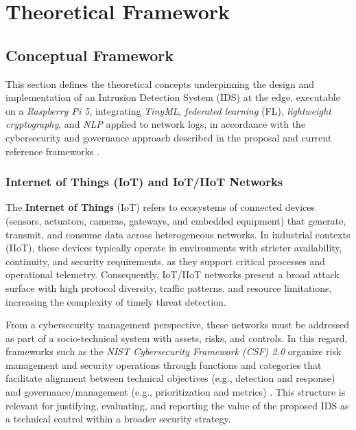 \chapter{Theoretical Framework}
\label{chap:theo}

\section{Conceptual Framework}
\label{sec:conceptos}

This section defines the theoretical concepts underpinning the design and implementation of an Intrusion Detection System (IDS) at the edge, executable on a \textit{Raspberry Pi 5}, integrating \textit{TinyML}, \textit{federated learning} (FL), \textit{lightweight cryptography}, and \textit{NLP} applied to network logs, in accordance with the cybersecurity and governance approach described in the proposal and current reference frameworks \cite{NISTCSF2024}.

\subsection{Internet of Things (IoT) and IoT/IIoT Networks}
The \textbf{Internet of Things} (IoT) refers to ecosystems of connected devices (sensors, actuators, cameras, gateways, and embedded equipment) that generate, transmit, and consume data across heterogeneous networks. In industrial contexts (IIoT), these devices typically operate in environments with stricter availability, continuity, and security requirements, as they support critical processes and operational telemetry. Consequently, IoT/IIoT networks present a broad attack surface with high protocol diversity, traffic patterns, and resource limitations, increasing the complexity of timely threat detection.

\newline
\newline
From a cybersecurity management perspective, these networks must be addressed as part of a socio-technical system with assets, risks, and controls. In this regard, frameworks such as the \textit{NIST Cybersecurity Framework (CSF) 2.0} organize risk management and security operations through functions and categories that facilitate alignment between technical objectives (e.g., detection and response) and governance/management (e.g., prioritization and metrics) \cite{NISTCSF2024}. This structure is relevant for justifying, evaluating, and reporting the value of the proposed IDS as a technical control within a broader security strategy.

